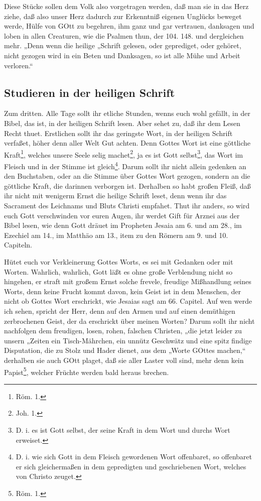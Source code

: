 Diese Stücke sollen dem Volk also vorgetragen werden, daß man sie in das Herz ziehe, daß also unser Herz dadurch zur Erkenntniß eigenen Unglücks beweget werde, Hülfe von GOtt zu begehren, ihm ganz und gar vertrauen, danksagen und loben in allen Creaturen, wie die Psalmen thun, der 104. 148. und dergleichen mehr. „Denn wenn die heilige „Schrift gelesen, oder geprediget, oder gehöret, nicht gezogen wird in ein Beten und Danksagen, so ist alle Mühe und Arbeit verloren.“

\subsection{Studieren in der heiligen Schrift}

Zum dritten. Alle Tage sollt ihr etliche Stunden, wenns euch wohl gefällt, in der Bibel, das ist, in der heiligen Schrift
lesen. Aber sehet zu, daß ihr dem Lesen Recht thuet. Erstlichen sollt ihr das geringste Wort, in der heiligen Schrift verfaßet, höher denn aller Welt Gut achten. Denn Gottes Wort ist eine göttliche Kraft\footnote{Röm. 1.}, welches unsere Seele selig machet\footnote{Joh. 1.}, ja es ist Gott selbst\footnote{D. i. es ist Gott selbst, der seine Kraft in dem Wort und durchs Wort erweiset.}, das Wort im Fleisch und in der Stimme ist gleich\footnote{D. i. wie sich Gott in dem Fleisch gewordenen Wort offenbaret, so offenbaret er sich gleichermaßen in dem gepredigten und geschriebenen Wort, welches von Christo zeuget.}. Darum sollt ihr nicht allein gedenken an den Buchstaben, oder an die Stimme über Gottes Wort gezogen, sondern an die göttliche Kraft, die darinnen verborgen ist. Derhalben so habt großen Fleiß, daß ihr nicht mit wenigerm Ernst die heilige Schrift leset, denn wenn ihr das Sacrament des Leichnams und Bluts Christi empfahet. Thut ihr anders, so wird euch Gott verschwinden vor euren Augen, ihr werdet Gift für Arznei aus der Bibel lesen, wie denn Gott dräuet im Propheten Jesaia am 6. und am 28., im Ezechiel am 14., im Matthäo am 13., item zu den Römern am 9. und 10. Capiteln.

Hütet euch vor Verkleinerung Gottes Worts, es sei mit Gedanken oder mit Worten. Wahrlich, wahrlich, Gott läßt es ohne große Verblendung nicht so hingehen, er straft mit großem Ernst solche frevele, freudige Mißhandlung seines Worts, denn keine Frucht kommt davon, kein Geist ist in dem Menschen, der nicht ob Gottes Wort erschrickt, wie Jesaias sagt am 66. Capitel. Auf wen werde ich sehen, spricht der Herr, denn auf den Armen und auf einen demüthigen zerbrochenen Geist, der da erschrickt über meinen Worten? Darum sollt ihr nicht nachfolgen dem freudigen, losen, rohen, falschen Christen, „die jetzt leider zu unsern „Zeiten ein Tisch-Mährchen, ein unnütz Geschwätz und eine spitz%
findige Disputation, die zu Stolz und Hader dienet, aus dem „Worte GOttes machen,“ derhalben sie auch GOtt plaget, daß sie aller Laster voll sind, mehr denn kein Papist\footnote{Röm. 1.}, welcher Früchte werden bald heraus brechen.

